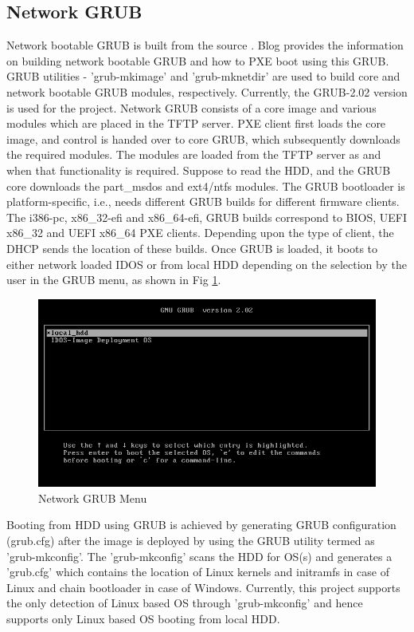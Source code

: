 \documentclass[a4paper,12pt]{article}
\begin{document}
\subsection{ Network GRUB}
Network bootable GRUB is built from the source \cite{GRUB}. Blog \cite{PXEb} provides the information on building network bootable GRUB and how to PXE boot using this GRUB. GRUB utilities - 'grub-mkimage' and 'grub-mknetdir' are used to build core and network bootable GRUB modules, respectively. Currently, the GRUB-2.02 version is used for the project. Network GRUB consists of a core image and various modules which are placed in the TFTP server. PXE client first loads the core image, and control is handed over to core GRUB, which subsequently downloads the required modules. The modules are loaded from the TFTP server as and when that functionality is required. Suppose to read the HDD, and the GRUB core downloads the part\_msdos and ext4/ntfs modules. The GRUB bootloader is platform-specific, i.e., needs different GRUB builds for different firmware clients. The i386-pc, x86\_32-efi and x86\_64-efi, GRUB builds correspond to BIOS,  UEFI x86\_32 and UEFI x86\_64 PXE clients. Depending upon the type of client, the DHCP sends the location of these builds. Once GRUB is loaded, it boots to either network loaded IDOS or from local HDD depending on the selection by the user in the GRUB menu, as shown in Fig \ref{grub}. 
\begin{figure}[h!]
    \centering
    \includegraphics[width=\linewidth]{grub.png}
    \caption{Network GRUB Menu}
    \label{grub}
\end{figure}

Booting from HDD using GRUB is achieved by generating GRUB configuration (grub.cfg) after the image is deployed by using the GRUB utility termed as 'grub-mkconfig'. The 'grub-mkconfig' scans the HDD for OS(s) and generates a 'grub.cfg' which contains the location of Linux kernels and initramfs in case of Linux and chain bootloader in case of Windows. Currently, this project supports the only detection of Linux based OS through 'grub-mkconfig' and hence supports only Linux based OS booting from local HDD.
\end{document}

